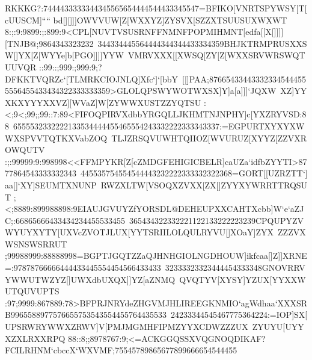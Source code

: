 {{{ RKKKG?:7444433333344345565654444544433345547=BFIKO[VNRTSPYWSY[T[cUUSCM]````%
 bd[][]]]OWVVUW[Z[WXXYZ]ZYSVX[SZZXTSUUSUXWXWT}
 \hbox{8:;:9:9899:;:899:9<CPL[NUVTVSUSRNFFNMNFPOPMIHMNT[edfa[[X[]]]][TNJB@;9864343323232%
 344334445564444344344433334359BHJKTRMPRUSXXSW[]YX[Z[WYYe]b[PGO]]]]YYW%
 VMRVXXX[[XWSQ[ZY[Z[WXXSRVWRSWQTUUVQR}
 \hbox{::99::;999:;999:9;?DFKKTVQRZc`[TLMRKCIOJNLQ]Xfc`]`[bbY%
 [[]PAA;876654334433323345444555556455433434322333333359>GLOLQPSWYWOTWXSX]Y]a[a]]]`JQXW%
 XZ]YYXKXYYYXXVZ][WVaZ]W[ZYWWXUSTZZYQTSU}
 \hbox{:<;9<;99;;99::7:89<FIFOQPIRVXdbbYRGQLLJKHMTNJNPHY]c[YXZRYVSD:88%
 6555532332222133534444455465554243332222333343337:=EGPURTXYXYXWWXSPVVTQTKXVabZOQ%
 TLJZRSQVUWHTQIIOZ[WVURUZ[XYYZ[ZZVXROWQUTV}
 \hbox{:;:99999:9:998998<<FFMPYKR[Z[cZMDGFEHIGICBELR]caUZa`idfbZYYTI>8777864543333332343%
 445535754554544443232222333332322368=GORT[[UZRZTT`]aa[]`XY]SEUMTXNUNP%
 RWZXLTW[VSOQXZVXX[ZX[]ZYYXYWRRTTRQSUT}
 \hbox{;<;8889:899988898:9EIAUJGVUYZfYORSDL@DEHEUPXXCAHTXcbb]W`e`aZJC;:66865666433434234455533455%
 365434322332221122133222223239CPQUPYZVWYUYXYTY[UXVcZVOTJLUX[YYTSRIILOLQULRYVU[]XOaY]ZYX%
 ZZZVXWSNSWSRRUT}
 \hbox{;99988999:88888998=BGPTJGQTZZaQJHNHGIOLNGDHOUW]ikfcaa[]Z]]XRNE=:97878766666444433445554454566433433%
 32333323323444454333348GNOVRRVYWWUTWZYZ[]UWXdbUXQX]]YZ[aZNMQ%
 QVQTYV[XYSY]YZUX[YYXXWUTQUVUPTS}
 \hbox{:97;9999:867889:78>BFPRJNRYdeZHGVMJHLIREEGKNMIO`agWdhaa`XXXSRB9965588977576655753543554455764435533%
 24233344545467775364224:=IOP]SX[UPSRWRYWWXZRWV]V[PMJMGMHFIPMZYYXCDWZZZUX%
 ZYUYU[UYYXZXLRXXRPQ}
 \hbox{88::8;;8978767:9;<=ACKGGQSSXVQGNOQDIKAF?FCILRHNM`cbccX`WXVMF;75545789865677899666654544455%
}}}
